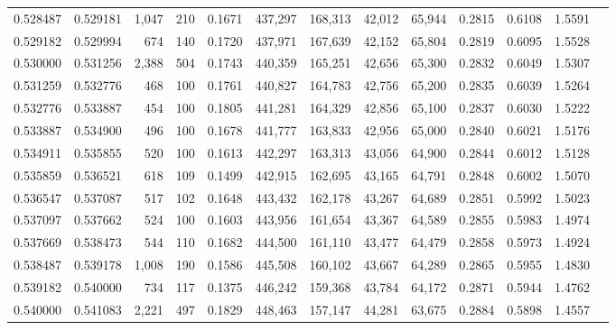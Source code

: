 \begin{tabular}{rrrrrrrrrrrrr}
0.528487 & 0.529181 & 1,047 & 210 &                                     0.1671 & 437,297 & 168,313 &  42,012 &  65,944 & 0.2815 & 0.6108 & 1.5591 \\
0.529182 & 0.529994 &   674 & 140 &                                     0.1720 & 437,971 & 167,639 &  42,152 &  65,804 & 0.2819 & 0.6095 & 1.5528 \\
0.530000 & 0.531256 & 2,388 & 504 &                                     0.1743 & 440,359 & 165,251 &  42,656 &  65,300 & 0.2832 & 0.6049 & 1.5307 \\
0.531259 & 0.532776 &   468 & 100 &                                     0.1761 & 440,827 & 164,783 &  42,756 &  65,200 & 0.2835 & 0.6039 & 1.5264 \\
0.532776 & 0.533887 &   454 & 100 &                                     0.1805 & 441,281 & 164,329 &  42,856 &  65,100 & 0.2837 & 0.6030 & 1.5222 \\
0.533887 & 0.534900 &   496 & 100 &                                     0.1678 & 441,777 & 163,833 &  42,956 &  65,000 & 0.2840 & 0.6021 & 1.5176 \\
0.534911 & 0.535855 &   520 & 100 &                                     0.1613 & 442,297 & 163,313 &  43,056 &  64,900 & 0.2844 & 0.6012 & 1.5128 \\
0.535859 & 0.536521 &   618 & 109 &                                     0.1499 & 442,915 & 162,695 &  43,165 &  64,791 & 0.2848 & 0.6002 & 1.5070 \\
0.536547 & 0.537087 &   517 & 102 &                                     0.1648 & 443,432 & 162,178 &  43,267 &  64,689 & 0.2851 & 0.5992 & 1.5023 \\
0.537097 & 0.537662 &   524 & 100 &                                     0.1603 & 443,956 & 161,654 &  43,367 &  64,589 & 0.2855 & 0.5983 & 1.4974 \\
0.537669 & 0.538473 &   544 & 110 &                                     0.1682 & 444,500 & 161,110 &  43,477 &  64,479 & 0.2858 & 0.5973 & 1.4924 \\
0.538487 & 0.539178 & 1,008 & 190 &                                     0.1586 & 445,508 & 160,102 &  43,667 &  64,289 & 0.2865 & 0.5955 & 1.4830 \\
0.539182 & 0.540000 &   734 & 117 &                                     0.1375 & 446,242 & 159,368 &  43,784 &  64,172 & 0.2871 & 0.5944 & 1.4762 \\
0.540000 & 0.541083 & 2,221 & 497 &                                     0.1829 & 448,463 & 157,147 &  44,281 &  63,675 & 0.2884 & 0.5898 & 1.4557 \\

\end{tabular}

